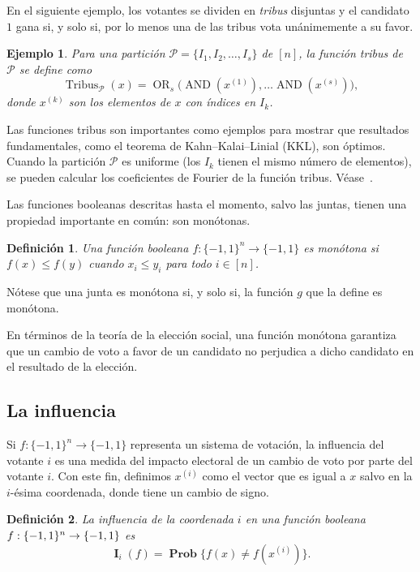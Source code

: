 \documentclass[autocontact]{gaceta}
\newtheorem{definition}{Definición}
\newtheorem{example}{Ejemplo}
\DeclareMathOperator{\II}{\mathbf{I}}
\DeclareMathOperator{\Prob}{\mathbf{Prob}}
\DeclareMathOperator{\AND}{AND}
\DeclareMathOperator{\OR}{OR}
\DeclareMathOperator{\Tribus}{Tribus}
\begin{document}
En el siguiente ejemplo, los votantes se dividen en \emph{tribus} disjuntas y el candidato~$1$ gana si, y solo si, por lo menos una de las tribus vota unánimemente a su favor.

\begin{example}\label{eg:tribes}
Para una partición $\mathcal{P}=\{I_1, I_2, \dots, I_s\}$ de $[n]$, la función tribus de $\mathcal{P}$ se define como
\[
\Tribus_{\mathcal{P}}(x)= \OR_s\big(\AND(x^{(1)}),\dots \AND(x^{(s)})\big),
\]
donde $x^{(k)}$ son los elementos de $x$ con índices en $I_k$.
\end{example}

Las funciones tribus son importantes como ejemplos para mostrar que resultados fundamentales, como el teorema de Kahn–Kalai–Linial (KKL), son óptimos. Cuando la partición $\mathcal{P}$ es uniforme (los $I_k$ tienen el mismo número de elementos), se pueden calcular los coeficientes de Fourier de la función tribus. Véase~\cite[proposición~4.14]{O'Do21}.

Las funciones booleanas descritas hasta el momento, salvo las juntas, tienen una propiedad importante en común: son monótonas.

\begin{definition}
Una función booleana $f:\{-1,1\}^n\to \{-1,1\}$ es monótona si $f(x) \leq f(y)$ cuando $x_i\leq y_i$ para todo $i\in [n]$.
\end{definition}

Nótese que una junta es monótona si, y solo si, la función $g$ que la define es monótona.

En términos de la teoría de la elección social, una función monótona garantiza que un cambio de voto a favor de un candidato no perjudica a dicho candidato en el resultado de la elección.

\subsection{La influencia}\label{sec:influence}

Si $f:\{-1,1\}^n\to\{-1,1\}$ representa un sistema de votación, la influencia del votante $i$ es una medida del impacto electoral de un cambio de voto por parte del votante $i$. Con este fin, definimos $x^{(i)}$ como el vector que es igual a $x$ salvo en la $i$-ésima coordenada, donde tiene un cambio de signo.

\begin{definition} La influencia de la coordenada $i$ en una función booleana $f:\{-1,1\}^n \linebreak\to\{-1,1\}$ es
\[
\II_i(f)= \Prob\big\{f(x)\neq f(x^{(i)})\big\}.
\]
\end{definition}
\end{document}

